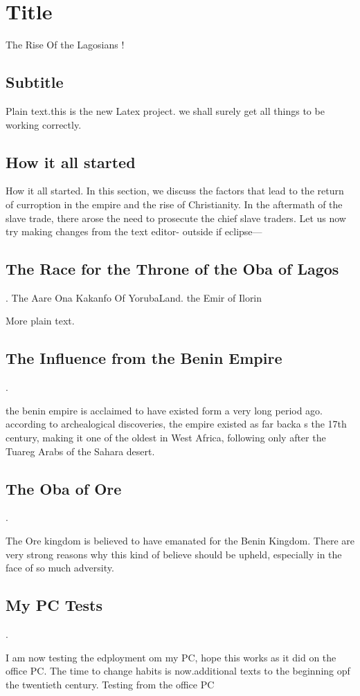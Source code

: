 \documentclass{article}
\begin{document}
\section{Title}The Rise Of the Lagosians !

\subsection{Subtitle}

Plain text.this is the new Latex project. we shall surely get all things to be
working correctly.

\subsection{How it all started}How it all started. In this section, we discuss
the factors that lead to the return of curroption in the empire and the rise of
Christianity. In the aftermath of the slave trade, there arose the need to
prosecute the chief slave traders.
Let us now try making changes from the text editor- outside if eclipse---


\subsection{The Race for the Throne of the Oba of Lagos}. The
Aare Ona Kakanfo Of YorubaLand. the Emir of Ilorin

More plain text.


\subsection{ The Influence from the Benin Empire}.

the benin empire is acclaimed to have existed form a very long period ago. according to archealogical discoveries, the empire existed as far backa s the 17th century, making it one of the oldest in West Africa, following only after the Tuareg Arabs of the Sahara desert.

\subsection{ The Oba of Ore}. 

The Ore kingdom is believed to have emanated for the Benin Kingdom. There are very strong reasons why this kind of believe should be upheld, especially in the face of so much adversity. 

\subsection{ My PC Tests}. 

I am now testing the edployment om my PC, hope this works as it did on the office PC. The time to change habits is now.additional texts to the beginning opf the twentieth century. Testing from the office PC
\end{document}
